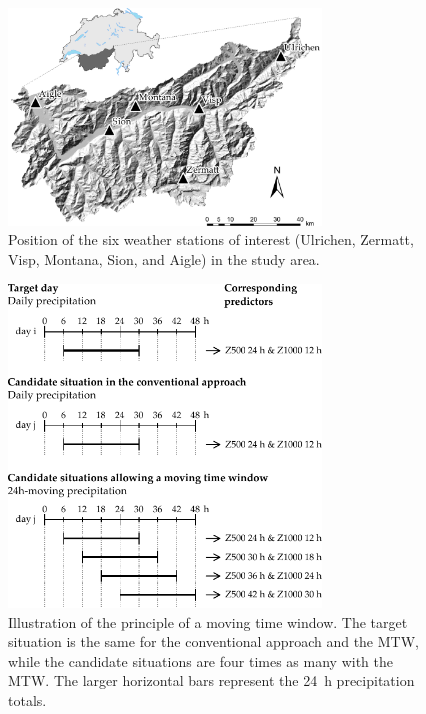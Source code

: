 \documentclass[hess, manuscript]{copernicus}
\begin{document}
	
	
	
	
	
	
	
	
	
	\begin{figure}[htb]
		\begin{center}
			\includegraphics[width=8.3cm]{figures/figure_map.pdf}
		\end{center}
		\caption{Position of the six weather stations of interest (Ulrichen, Zermatt, Visp, Montana, Sion, and Aigle) in the study area.}
		\label{fig:map}
	\end{figure}
	
	\begin{figure}[htb]
		\begin{center}
			\includegraphics[width=8.3cm]{figures/illustration_moving_window.pdf}
		\end{center}
		\caption{Illustration of the principle of a moving time window. The target situation is the same for the conventional approach and the MTW, while the candidate situations are four times as many with the MTW. The larger horizontal bars represent the 24~h precipitation totals.}
		\label{fig:principle}
	\end{figure}
	
\end{document}
